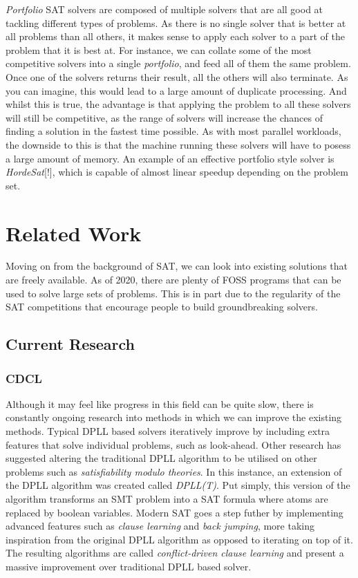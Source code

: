 \documentclass{article}
\begin{document}
\textit{Portfolio} SAT solvers are composed of multiple solvers that are all good at tackling
different types of problems. As there is no single solver that is better at all problems than all
others, it makes sense to apply each solver to a part of the problem that it is best at. For
instance, we can collate some of the most competitive solvers into a single \textit{portfolio}, and
feed all of them the same problem. Once one of the solvers returns their result, all the others will
also terminate. As you can imagine, this would lead to a large amount of duplicate processing. And
whilst this is true, the advantage is that applying the problem to all these solvers will still be
competitive, as the range of solvers will increase the chances of finding a solution in the fastest
time possible. As with most parallel workloads, the downside to this is that the machine running
these solvers will have to posess a large amount of memory. An example of an effective portfolio
style solver is \textit{HordeSat}[!], which is capable of almost linear speedup depending on the
problem set. %

\section{Related Work}
Moving on from the background of SAT, we can look into existing solutions that are freely available.
As of 2020, there are plenty of FOSS programs that can be used to solve large sets of problems. This
is in part due to the regularity of the SAT competitions that encourage people to build
groundbreaking solvers.

\subsection{Current Research}
\subsubsection{CDCL}
Although it may feel like progress in this field can be quite slow, there is constantly ongoing research into methods in which we
can improve the existing methods. Typical DPLL based solvers iteratively improve by including extra features that solve individual
problems, such as look-ahead. Other research has suggested altering the traditional DPLL algorithm to be utilised on other
problems such as \textit{satisfiability modulo theories}. In this instance, an extension of the DPLL algorithm was created called
\textit{DPLL(T)}. Put simply, this version of the algorithm transforms an SMT problem into a SAT formula where atoms are replaced
by boolean variables. Modern SAT goes a step futher by implementing advanced features such as \textit{clause learning} and
\textit{back jumping}, more taking inspiration from the original DPLL algorithm as opposed to iterating on top of it. The
resulting algorithms are called \textit{conflict-driven clause learning} and present a massive improvement over traditional DPLL
based solver.
\end{document}
